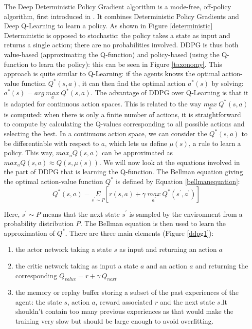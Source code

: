 The Deep Deterministic Policy Gradient algorithm is a mode-free, off-policy algorithm, first introduced in \cite{ddpg2015}. It combines Deterministic Policy Gradients and Deep Q-Learning to learn a policy. As shown in Figure \ref{deterministic} Deterministic is opposed to stochastic: the policy takes a state as input and returns a single action; there are no probabilities involved. \newline
DDPG is thus both value-based (approximating the Q-function) and policy-based (using the Q-function to learn the policy): this can be seen in Figure \ref{taxonomy}. This approach is quite similar to Q-Learning: if the agents knows the optimal action-value function $Q^{*}(s,a)$, it can then find the optimal action $a^{*}(s)$ by solving: $a^{*}(s) = arg \: \underset{a}{max} \: Q^{*}(s,a)$.
The advantage of DDPG over Q-Learning is that it is adapted for continuous action spaces. This is related to the way $\underset{a}{max} \: Q^{*}(s,a)$ is computed: when there is only a finite number of actions, it is straightforward to compute by calculating the Q-values corresponding to all possible actions and selecting the best. In a continuous action space, we can consider the $Q^{*}(s,a)$ to be differentiable with respect to $a$, which lets us define $\mu(s)$, a rule to learn a policy. This way, $max_{a}Q(s,a)$ can be approximated as $max_{a}Q(s,a) \approx Q(s,\mu(s))$. \newline
We will now look at the equations involved in the part of DDPG that is learning the Q-function. The Bellman equation giving the optimal action-value function $Q^{*}$ is defined by Equation \ref{bellmanequation}:
\begin{equation}
\label{bellmanequation}
	Q^{*}(s,a) = \underset{s^{'} \sim P}{E}\left[r(s,a)+\gamma \: \underset{a^{'}}{max} \: Q^{*}(s^{'},a^{'})\right]
\end{equation}
		
Here, $ s^{'} \sim P $ means that the next state $ s^{'} $ is sampled by the environment from a probability distribution $P$. The Bellman equation is then used to learn the approximation of $ Q^{*} $.		
There are three main elements (Figure \ref{ddpg1}): 
\begin{enumerate}
	\item the actor network taking a state $s$ as input and returning an action $a$	
	\item the critic network taking as input a state $a$ and an action $a$ and returning the corresponding $Q_{value} = r + \gamma \: Q_{next}$ 
	\item the memory or replay buffer storing a subset of the past experiences of the agent: the state $s$, action $a$, reward associated $r$ and the next state $s$.It shouldn't contain too many previous experiences as that would make the training very slow but should be large enough to avoid overfitting.

\end{enumerate}


